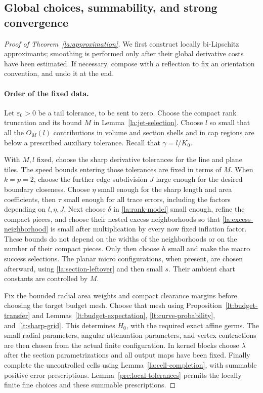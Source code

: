 \subsection{Global choices, summability, and strong convergence}

\begin{proof}[Proof of Theorem~\ref{la:approximation}]
We first construct locally bi-Lipschitz approximants; smoothing is
performed only after their global derivative costs have been
estimated.  If necessary, compose with a reflection to fix an
orientation convention, and undo it at the end.

\paragraph{Order of the fixed data.}
Let $\varepsilon_0>0$ be a tail tolerance, to be sent to zero.
Choose the compact rank truncation and its bound $M$ in
Lemma~\ref{la:jet-selection}.  Choose $l$ so small that all the
$O_M(l)$ contributions in volume and section shells and in cap
regions are below a prescribed auxiliary tolerance.  Recall that
$\gamma=l/K_0$.

With $M,l$ fixed, choose the sharp derivative tolerances for the
line and plane tiles.  The speed bounds entering those tolerances
are fixed in terms of $M$.  When $k=p=2$, choose the further edge
subdivision $J$ large enough for the desired boundary closeness.
Choose $\eta$ small enough for the sharp length and area coefficients,
then $\tau$ small enough for all trace errors, including the factors
depending on $l,\eta,J$.  Next choose $\delta$ in
\eqref{la:rank-model} small enough, refine the compact pieces, and
choose their nested excess neighborhoods so that
\eqref{la:excess-neighborhood} is small after multiplication by every
now fixed inflation factor.  These bounds do not depend on the
widths of the neighborhoods or on the number of their compact
pieces.  Only then choose $h$ small and make the macro success
selections.  The planar micro configurations, when present, are
chosen afterward, using \eqref{la:section-leftover} and then small
$s$.  Their ambient chart constants are controlled by $M$.

Fix the bounded radial area weights and compact clearance margins
before choosing the target budget mesh.  Choose that mesh using
Proposition~\ref{lt:budget-transfer} and Lemmas~\ref{lt:budget-expectation},
\ref{lt:curve-probability}, and~\ref{lt:sharp-grid}.  This determines
$H_0$, with the required exact affine germs.  The small radial
parameters, angular attenuation parameters, and vertex contractions
are then chosen from the actual finite configuration.  In kernel
blocks choose $\lambda$ after the section parametrizations and all
output maps have been fixed.  Finally complete the uncontrolled
cells using Lemma~\ref{la:cell-completion}, with summable positive
error prescriptions.  Lemma~\ref{pre:local-tolerances} permits the
locally finite fine choices and these summable prescriptions.


\end{proof}
